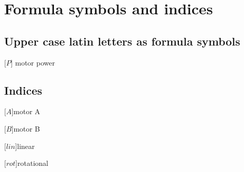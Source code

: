 
\newcommand{\acrounit}[1]{
\acroextra{\makebox[18mm][l]{\si{#1}}}
}

\chapter*{Formula symbols and indices}




\section*{Upper case latin letters as formula symbols}
\begin{acronym}[LONGEST]
[\ensuremath{P}]{\acrounit{\%}motor power}
\end{acronym}



\section*{Indices}
\begin{acronym}[LONGEST]
[\ensuremath{A}]{motor A}
\end{acronym}
\begin{acronym}[LONGEST]
    [\ensuremath{B}]{motor B}
\end{acronym}
\begin{acronym}[LONGEST]
    [\ensuremath{lin}]{linear}
\end{acronym}
\begin{acronym}[LONGEST]
    [\ensuremath{rot}]{rotational}
\end{acronym}